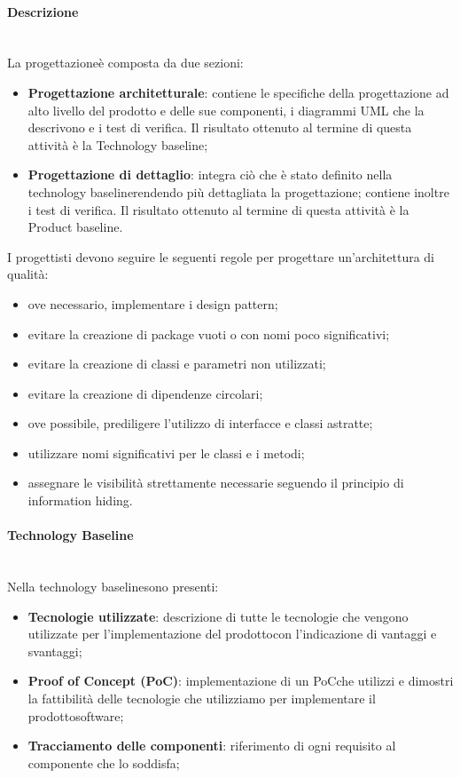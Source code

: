 			\paragraph*{Descrizione}\mbox{}\\ [1mm]
			La progettazione\glosp è composta da due sezioni:
			\begin{itemize}
				\item \textbf{Progettazione architetturale}: contiene le specifiche della progettazione ad alto livello del prodotto e delle sue componenti, i diagrammi UML che la descrivono e i test di verifica. Il risultato ottenuto al termine di questa attività è la Technology baseline\glo;
				\item \textbf{Progettazione di dettaglio}: integra ciò che è stato definito nella technology baseline\glosp rendendo più dettagliata la progettazione; contiene inoltre i test di verifica.	Il risultato ottenuto al termine di questa attività è la Product baseline\glo.
			\end{itemize}
			I progettisti devono seguire le seguenti regole per progettare un'architettura di qualità:
			\begin{itemize}
				\item ove necessario, implementare i design pattern\glo;
				\item evitare la creazione di package vuoti o con nomi poco significativi;
				\item evitare la creazione di classi e parametri non utilizzati;
				\item evitare la creazione di dipendenze circolari;
				\item ove possibile, prediligere l'utilizzo di interfacce e classi astratte;
				\item utilizzare nomi significativi per le classi e i metodi;
				\item assegnare le visibilità strettamente necessarie seguendo il principio di information hiding.
			\end{itemize}
			
			\paragraph*{Technology Baseline}\mbox{}\\ [1mm]
			Nella technology baseline\glosp sono presenti:
			\begin{itemize}
				\item \textbf{Tecnologie utilizzate}: descrizione di tutte le tecnologie che vengono utilizzate per l'implementazione del prodotto\glosp con l'indicazione di vantaggi e svantaggi;
				\item \textbf{Proof of Concept (PoC)}: implementazione di un PoC\glosp che utilizzi e dimostri la fattibilità delle tecnologie che utilizziamo per implementare il prodotto\glosp software;
				\item \textbf{Tracciamento delle componenti}: riferimento di ogni requisito al componente che lo soddisfa;
			\end{itemize}
